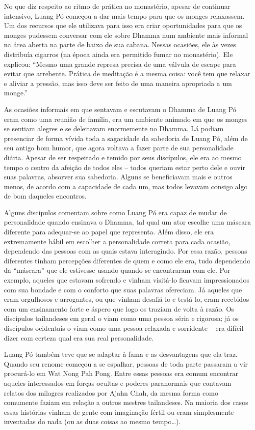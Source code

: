 No que diz respeito ao ritmo de prática no monastério, apesar de
continuar intensivo, Luang Pó começou a dar mais tempo para que os
monges relaxassem. Um dos recursos que ele utilizava para isso era criar
oportunidades para que os monges pudessem conversar com ele sobre Dhamma
num ambiente mais informal na área aberta na parte de baixo de sua
cabana. Nessas ocasiões, ele às vezes distribuía cigarros (na época
ainda era permitido fumar no monastério). Ele explicou: ``Mesmo uma
grande represa precisa de uma válvula de escape para evitar que
arrebente. Prática de meditação é a mesma coisa: você tem que relaxar e
aliviar a pressão, mas isso deve ser feito de uma maneira apropriada a
um monge.''

As ocasiões informais em que sentavam e escutavam o Dhamma de Luang Pó
eram como uma reunião de família, era um ambiente animado em que os
monges se sentiam alegres e se deleitavam enormemente no Dhamma. Lá
podiam presenciar de forma vívida toda a sagacidade da sabedoria de
Luang Pó, além de seu antigo bom humor, que agora voltava a fazer parte
de sua personalidade diária. Apesar de ser respeitado e temido por seus
discípulos, ele era ao mesmo tempo o centro da afeição de todos eles --
todos queriam estar perto dele e ouvir suas palavras, absorver sua
sabedoria. Alguns se beneficiavam mais e outros menos, de acordo com a
capacidade de cada um, mas todos levavam consigo algo de bom daqueles
encontros.

Alguns discípulos comentam sobre como Luang Pó era capaz de mudar de
personalidade quando ensinava o Dhamma, tal qual um ator escolhe uma
máscara diferente para adequar-se ao papel que representa. Além disso,
ele era extremamente hábil em escolher a personalidade correta para cada
ocasião, dependendo das pessoas com as quais estava interagindo. Por
essa razão, pessoas diferentes tinham percepções diferentes de quem e
como ele era, tudo dependendo da ``máscara'' que ele estivesse usando
quando se encontraram com ele. Por exemplo, aqueles que estavam sofrendo
e vinham visitá-lo ficavam impressionados com sua bondade e com o
conforto que suas palavras ofereciam. Já aqueles que eram orgulhosos e
arrogantes, ou que vinham desafiá-lo e testá-lo, eram recebidos com um
ensinamento forte e áspero que logo os traziam de volta à razão. Os
discípulos tailandeses em geral o viam como uma pessoa séria e rigorosa;
já os discípulos ocidentais o viam como uma pessoa relaxada e sorridente
-- era difícil dizer com certeza qual era sua real personalidade.

Luang Pó também teve que se adaptar à fama e as desvantagens que ela
traz. Quando seu renome começou a se espalhar, pessoas de toda parte
passaram a vir procurá-lo em Wat Nong Pah Pong. Entre essas pessoas era
comum encontrar aqueles interessados em forças ocultas e poderes
paranormais que contavam relatos dos milagres realizados por Ajahn Chah,
da mesma forma como comumente faziam em relação a outros mestres
tailandeses. Na maioria dos casos essas histórias vinham de gente com
imaginação fértil ou eram simplesmente inventadas do nada (ou as duas
coisas ao mesmo tempo\ldots{}).

